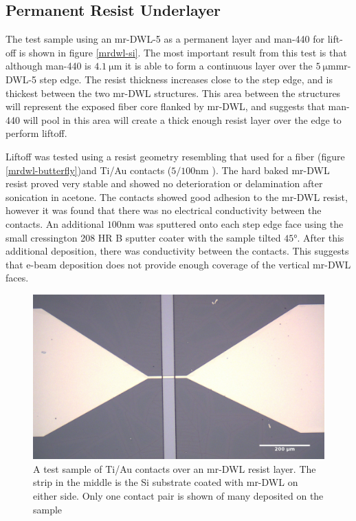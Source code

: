  \subsection{Permanent Resist Underlayer}
 
 The test sample using an mr-DWL-5 as a permanent layer and man-440 for lift-off is shown in figure \ref{mrdwl-si}. The most important result from this test is that although man-440 is $\SI{4.1}{\micro\meter}$ it is able to form a continuous layer over the $\SI{5}{\micro\meter}$mr-DWL-5 step edge. The resist thickness increases close to the step edge, and is thickest between the two mr-DWL structures. This area between the structures will represent the exposed fiber core flanked by mr-DWL, and suggests that man-440 will pool in this area will create a thick enough resist layer over the edge to perform liftoff. 
 
 Liftoff was tested using a resist geometry resembling that used for a fiber (figure \ref{mrdwl-butterfly})and Ti/Au contacts ($5/100 \si{\nano\meter}$ ). The hard baked mr-DWL resist proved very stable and showed no deterioration or delamination after sonication in acetone. The contacts showed good adhesion to the mr-DWL resist, however it was found that there was no electrical conductivity between the contacts. An additional $100 \si{\nano\meter}$ was sputtered onto each step edge face using the small cressington 208 HR B  sputter coater with the sample tilted $\ang{45}$. After this additional deposition, there was conductivity between the contacts. This suggests that e-beam deposition does not provide enough coverage of the vertical mr-DWL faces.
 \begin{figure}
    \centering
    \includegraphics[width=.8\textwidth]{fig/Results/mr-dwl_test_butterfly.jpg}
    \caption{A test sample of Ti/Au contacts over an mr-DWL resist layer. The strip in the middle is the Si substrate coated with mr-DWL on either side. Only one contact pair is shown of many deposited on the sample}
    \label{mrdwl-optic}
\end{figure}

